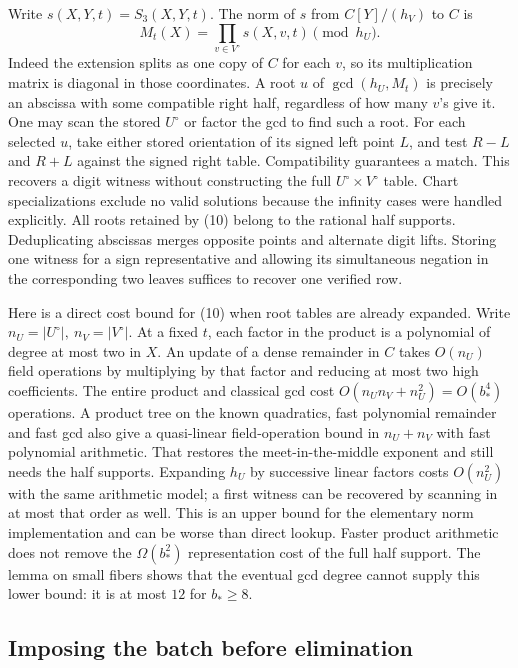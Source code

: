 \documentclass[11pt]{article}
\begin{document}
Write \(s(X,Y,t)=S_3(X,Y,t)\). The norm of \(s\) from \(C[Y]/(h_V)\) to \(C\) is
\[
  M_t(X)=\prod_{v\in V^\circ} s(X,v,t)\pmod{h_U}.
\tag{10}
\]
Indeed the extension splits as one copy of \(C\) for each \(v\), so its multiplication matrix is diagonal in those coordinates. A root \(u\) of \(\gcd(h_U,M_t)\) is precisely an abscissa with some compatible right half, regardless of how many \(v\)'s give it. One may scan the stored \(U^\circ\) or factor the gcd to find such a root. For each selected \(u\), take either stored orientation of its signed left point \(L\), and test \(R-L\) and \(R+L\) against the signed right table. Compatibility guarantees a match. This recovers a digit witness without constructing the full \(U^\circ\times V^\circ\) table. Chart specializations exclude no valid solutions because the infinity cases were handled explicitly. All roots retained by (10) belong to the rational half supports. Deduplicating abscissas merges opposite points and alternate digit lifts. Storing one witness for a sign representative and allowing its simultaneous negation in the corresponding two leaves suffices to recover one verified row.

Here is a direct cost bound for (10) when root tables are already expanded. Write \(n_U=|U^\circ|,\ n_V=|V^\circ|\). At a fixed \(t\), each factor in the product is a polynomial of degree at most two in \(X\). An update of a dense remainder in \(C\) takes \(O(n_U)\) field operations by multiplying by that factor and reducing at most two high coefficients. The entire product and classical gcd cost \(O(n_Un_V+n_U^2)=O(b_*^4)\) operations. A product tree on the known quadratics, fast polynomial remainder and fast gcd also give a quasi-linear field-operation bound in \(n_U+n_V\) with fast polynomial arithmetic. That restores the meet-in-the-middle exponent and still needs the half supports. Expanding \(h_U\) by successive linear factors costs \(O(n_U^2)\) with the same arithmetic model; a first witness can be recovered by scanning in at most that order as well. This is an upper bound for the elementary norm implementation and can be worse than direct lookup. Faster product arithmetic does not remove the \(\Omega(b_*^2)\) representation cost of the full half support. The lemma on small fibers shows that the eventual gcd degree cannot supply this lower bound: it is at most \(12\) for \(b_*\ge8\).

\subsection*{Imposing the batch before elimination}
\end{document}

